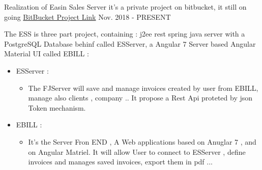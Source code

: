 


\begin{cventries}


\cventry
{Realization of Easin Sales Server } %
{it's a private project on bitbucket, it still on going } %
{ \href{https://bitbucket.org/account/user/easysoftin/projects/EAS}{BitBucket Project Link} }%
{Nov. 2018 - PRESENT} %
{ %
\begin{cvitems}
\item {The ESS is three part project, containing : j2ee rest spring java server with a PostgreSQL Database behinf called ESServer, a Angular 7 Server based Angular Material UI called EBILL :}
\begin{itemize}
\item {  ESServer : }
\begin{itemize}
\item{ The FJServer will save and manage invoices created by user from EBILL, manage also clients , company ..
It propose a Rest Api proteted by json Token mechanism.}
\end{itemize}
\item {EBILL :}
\begin{itemize}
\item {It's the Server Fron END , A Web applications based on Anuglar 7 , and on Angular Matriel.
It will allow User  to connect to ESServer , define invoices and manages saved invoices, export them in pdf ...}
 \end{itemize}
 \end{itemize}
\end{cvitems}
}



\end{cventries}
